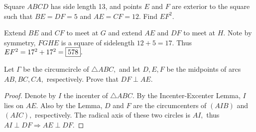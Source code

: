 \documentclass[letterpaper,oneside]{scrartcl}
\begin{document}
\begin{problem*}
  Square $ABCD$ has side length 13, and points $E$ and $F$ are exterior to the square such that $BE = DF = 5$ and $AE = CF = 12$. Find $EF^2$. 
\end{problem*}
\begin{soln}
  Extend $BE$ and $CF$ to meet at $G$ and extend $AE$ and $DF$ to meet at $H.$ Note by symmetry, $FGHE$ is a square of sidelength $12+5=17.$ Thus $EF^2 = 17^2+17^2 = \fbox{578}.$
\end{soln}
\begin{problem*}
  Let $\Gamma$ be the circumcircle of $\triangle ABC,$ and let $D,E,F$ be the midpoints of arcs $AB,BC,CA,$ respectively. Prove that $DF\perp AE.$
\end{problem*}
\begin{proof}
  Denote by $I$ the incenter of $\triangle ABC.$ By the Incenter-Excenter Lemma, $I$ lies on $AE.$ Also by the Lemma, $D$ and $F$ are the circumcenters of $(AIB)$ and $(AIC),$ respectively. The radical axis of these two circles is $AI,$ thus $AI \perp DF \Longrightarrow AE \perp DF.$
\end{proof}
\end{document}
